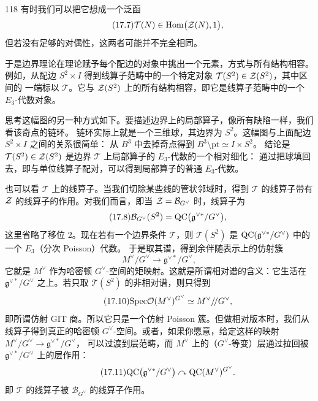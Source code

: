 \begin{srcrem}{118}
有时我们可以把它想成一个泛函
\begin{equation}\tag{17.7}\label{eq:17.7}
\mathcal T(N)\in\mathrm{Hom}\bigl(\mathcal{Z}(N),1\bigr),
\end{equation}
但若没有足够的对偶性，这两者可能并不完全相同。
\end{srcrem}

于是边界理论在理论赋予每个配边的对象中挑出一个元素，方式与所有结构相容。例如，从配边
$S^2\times I$ 得到线算子范畴中的一个特定对象 $\mathcal T(S^2)\in\mathcal{Z}(S^2)$，其中区间的
一端标以 $\mathcal T$。它与 $\mathcal{Z}(S^2)$ 上的所有结构相容，即它是线算子范畴中的一个
$E_3$-代数对象。

思考这幅图的另一种方式如下。要描述边界上的局部算子，像所有缺陷一样，我们看该奇点的链环。
链环实际上就是一个三维球，其边界为 $S^2$。这幅图与上面配边 $S^2\times I$ 之间的关系很简单：
从 $B^3$ 中去掉奇点得到 $B^3\setminus \mathrm{pt}\simeq I\times S^2$。
结论是 $\mathcal T(S^2)\in\mathcal{Z}(S^2)$ 是边界 $\mathcal T$ 上局部算子的 $E_3$-代数的一个相对细化：
通过把球填回去，即与单位线算子配对，可以得到局部算子的普通 $E_3$-代数。

也可以看 $\mathcal T$ 上的线算子。当我们切除某些线的管状邻域时，得到 $\mathcal T$ 的线算子带有
$\mathcal{Z}$ 的线算子的作用。对我们而言，即当 $\mathcal{Z}=\mathcal B_{G^{\vee}}$ 时，线算子为
\begin{equation}\tag{17.8}\label{eq:17.8}
\mathcal B_{G^{\vee}}(S^2)=\mathrm{QC}\bigl(\mathfrak g^{\vee*}/G^{\vee}\bigr),
\end{equation}
这里省略了移位 2。现在若有一个边界条件 $\mathcal T$，则 $\mathcal T(S^2)$ 是
$\mathrm{QC}(\mathfrak g^{\vee*}/G^{\vee})$ 中的一个 $E_3$（分次 Poisson）代数。
于是取其谱，得到余伴随表示上的仿射簇
\begin{equation}\tag{17.9}\label{eq:17.9}
M^{\vee}/G^{\vee}\to\mathfrak g^{\vee*}/G^{\vee},
\end{equation}
它就是 $M^{\vee}$ 作为哈密顿 $G^{\vee}$-空间的矩映射。这就是所谓相对谱的含义：它生活在
$\mathfrak g^{\vee*}/G^{\vee}$ 之上。若只取 $\mathcal T(S^2)$ 的非相对谱，则只得到
\begin{equation}\tag{17.10}\label{eq:17.10}
\mathrm{Spec}\mathcal{O}(M^{\vee})^{G^{\vee}}\simeq M^{\vee}/\!/G^{\vee},
\end{equation}
即所谓仿射 GIT 商。所以它只是一个仿射 Poisson 簇。但做相对版本时，我们从线算子得到真正的哈密顿
$G^{\vee}$-空间。或者，如果你愿意，给定这样的映射 $M^{\vee}/G^{\vee}\to\mathfrak g^{\vee*}/G^{\vee}$，
可以过渡到层范畴，而 $M^{\vee}$ 上的（$G^{\vee}$-等变）层通过拉回被
$\mathfrak g^{\vee*}/G^{\vee}$ 上的层作用：
\begin{equation}\tag{17.11}\label{eq:17.11}
\mathrm{QC}\bigl(\mathfrak g^{\vee*}/G^{\vee}\bigr)\curvearrowright\mathrm{QC}(M^{\vee})^{G^{\vee}}.
\end{equation}
即 $\mathcal T$ 的线算子被 $\mathcal B_{G^{\vee}}$ 的线算子作用。

